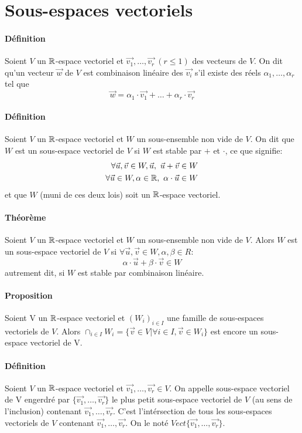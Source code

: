 %
%
\section{Sous-espaces vectoriels}
%
%
\paragraph{Définition} Soient $V$ un $\mathbb{R}$-espace vectoriel et $\vec{v_1}, \ldots, \vec{v_r} ~ (r\leq 1)$ des vecteurs de $V$. On dit qu'un vecteur $\vec{w}$ de $V$ est combinaison linéaire des $\vec{v_i}$ s'il existe des réels $\alpha_1, \ldots, \alpha_r$ tel que
$$\vec{w} = \alpha_1 \cdot \vec{v_1} + \ldots + \alpha_r \cdot \vec{v_r}$$

\paragraph{Définition} Soient $V$ un $\mathbb{R}$-espace vectoriel et $W$ un sous-ensemble non vide de $V$. On dit que $W$ est un sous-espace vectoriel de $V$ si $W$ est stable par $+$ et $\cdot$, ce que signifie:
\begin{eqnarray*}
  \forall \vec{u}, \vec{v} \in W, \vec{u}, ~ \vec{u} + \vec{v} \in W \\
  \forall \vec{u} \in W, \alpha \in \mathbb{R}, ~ \alpha \cdot \vec{u} \in W \\
\end{eqnarray*}
et que $W$ (muni de ces deux lois) soit un $\mathbb{R}$-espace vectoriel.

\paragraph{Théorème} Soient $V$ un $\mathbb{R}$-espace vectoriel et $W$ un sous-ensemble non vide de $V$. Alors $W$ est un sous-espace vectoriel de $V$ si $\forall \vec{u}, \vec{v} \in W, \alpha, \beta \in R$:
$$\alpha \cdot \vec{u} + \beta \cdot \vec{v} \in W$$
autrement dit, si $W$ est stable par combinaison linéaire.

\paragraph{Proposition} Soient V un $\mathbb{R}$-espace vectoriel et $(W_i)_{i \in I}$ une famille de sous-espaces vectoriels de $V$. Alors $\cap_{i \in I} W_i = \{ \vec{v} \in V | \forall i \in I, \vec{v} \in W_i\}$ est encore un sous-espace vectoriel de V.

\paragraph{Définition} Soient $V$ un $\mathbb{R}$-espace vectoriel et $\vec{v_1}, \ldots, \vec{v_r} \in V$. On appelle sous-espace vectoriel de V engerdré par $\{\vec{v_1}, \ldots, \vec{v_r}\}$ le plus petit sous-espace vectoriel de $V$ (au sens de l'inclusion) contenant $\vec{v_1}, \ldots, \vec{v_r}$. C'est l'intérsection de tous les sous-espaces vectoriels de $V$ contenant $\vec{v_1}, \ldots, \vec{v_r}$. On le noté $Vect\{\vec{v_1}, \ldots, \vec{v_r}\}$.

